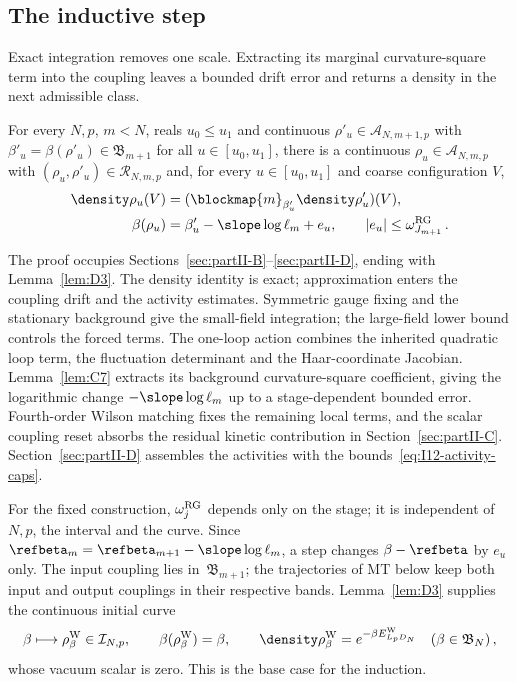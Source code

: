 \subsection{The inductive step}

Exact integration removes one scale. Extracting its marginal curvature-square term into the coupling leaves a bounded drift error and returns a density in the next admissible class.

\begin{theorem}\label{prop:RG}
For every $N,p$, $m<N$, reals $u_0\le u_1$ and continuous $\rho'_u\in\mathcal A_{N,m+1,p}$ with $\beta'_u=\beta(\rho'_u)\in\mathfrak B_{m+1}$ for all $u\in[u_0,u_1]$, there is a continuous $\rho_u\in\mathcal A_{N,m,p}$ with $(\rho_u,\rho'_u)\in\mathcal R_{N,m,p}$ and, for every $u\in[u_0,u_1]$ and coarse configuration $V$,
\begin{align*}
\density\rho_u(V)&=(\blockmap{m}_{\beta'_u}\density\rho'_u)(V),\\
\beta(\rho_u)&=\beta'_u-\slope\log\ell_m+e_u,
\qquad |e_u|\le\omega_{J_{m+1}}^{\rm RG}\,.
\end{align*}
\end{theorem}

The proof occupies Sections~\ref{sec:partII-B}--\ref{sec:partII-D}, ending with Lemma~\ref{lem:D3}. The density identity is exact; approximation enters the coupling drift and the activity estimates. Symmetric gauge fixing and the stationary background give the small-field integration; the large-field lower bound controls the forced terms. The one-loop action combines the inherited quadratic loop term, the fluctuation determinant and the Haar-coordinate Jacobian. Lemma~\ref{lem:C7} extracts its background curvature-square coefficient, giving the logarithmic change $-\slope\log\ell_m$ up to a stage-dependent bounded error. Fourth-order Wilson matching fixes the remaining local terms, and the scalar coupling reset absorbs the residual kinetic contribution in Section~\ref{sec:partII-C}. Section~\ref{sec:partII-D} assembles the activities with the bounds~\eqref{eq:I12-activity-caps}.

For the fixed construction, $\omega_j^{\rm RG}$ depends only on the stage; it is independent of $N,p$, the interval and the curve. Since $\refbeta_m=\refbeta_{m+1}-\slope\log\ell_m$, a step changes $\beta-\refbeta$ by $e_u$ only. The input coupling lies in~$\mathfrak B_{m+1}$; the trajectories of MT below keep both input and output couplings in their respective bands. Lemma~\ref{lem:D3} supplies the continuous initial curve
\begin{equation}\label{eq:I12-Wilson-initialization}
\beta\longmapsto\rho^{\rm W}_\beta\in\mathcal I_{N,p},\qquad
\beta(\rho^{\rm W}_\beta)=\beta,\qquad
\density\rho^{\rm W}_\beta=e^{-\beta E^{\rm W}_{L_pD_N}}
\quad(\beta\in\mathfrak B_N)\,,
\end{equation}
whose vacuum scalar is zero. This is the base case for the induction.

